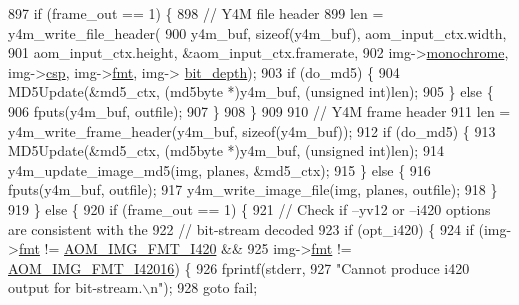 \begin{DoxyCodeInclude}
{{{{{{{{{{{{{{{{{{{{{{{{{{{{{{{{{{{{{{{{{{{{{{897             \textcolor{keywordflow}{if} (frame\_out == 1) \{
898               \textcolor{comment}{// Y4M file header}
899               len = y4m\_write\_file\_header(
900                   y4m\_buf, \textcolor{keyword}{sizeof}(y4m\_buf), aom\_input\_ctx.width,
901                   aom\_input\_ctx.height, &aom\_input\_ctx.framerate,
902                   img->\hyperlink{structaom__image_ab7886616025ff8bd0bb96d967fca9ad8}{monochrome}, img->\hyperlink{structaom__image_a4f235c521bc95a061e9e0b2a3d5d457e}{csp}, img->\hyperlink{structaom__image_a6c64b1ab918d80d52eb8f5d6d957e825}{fmt}, img->
      \hyperlink{structaom__image_a46ed9ffd741938d306a0db5a24bdcf8e}{bit\_depth});
903               \textcolor{keywordflow}{if} (do\_md5) \{
904                 MD5Update(&md5\_ctx, (md5byte *)y4m\_buf, (\textcolor{keywordtype}{unsigned} \textcolor{keywordtype}{int})len);
905               \} \textcolor{keywordflow}{else} \{
906                 fputs(y4m\_buf, outfile);
907               \}
908             \}
909 
910             \textcolor{comment}{// Y4M frame header}
911             len = y4m\_write\_frame\_header(y4m\_buf, \textcolor{keyword}{sizeof}(y4m\_buf));
912             \textcolor{keywordflow}{if} (do\_md5) \{
913               MD5Update(&md5\_ctx, (md5byte *)y4m\_buf, (\textcolor{keywordtype}{unsigned} \textcolor{keywordtype}{int})len);
914               y4m\_update\_image\_md5(img, planes, &md5\_ctx);
915             \} \textcolor{keywordflow}{else} \{
916               fputs(y4m\_buf, outfile);
917               y4m\_write\_image\_file(img, planes, outfile);
918             \}
919           \} \textcolor{keywordflow}{else} \{
920             \textcolor{keywordflow}{if} (frame\_out == 1) \{
921               \textcolor{comment}{// Check if --yv12 or --i420 options are consistent with the}
922               \textcolor{comment}{// bit-stream decoded}
923               \textcolor{keywordflow}{if} (opt\_i420) \{
924                 \textcolor{keywordflow}{if} (img->\hyperlink{structaom__image_a6c64b1ab918d80d52eb8f5d6d957e825}{fmt} != \hyperlink{aom__image_8h_a930317c04b4bd0a660bb5e744055523cabd778a3d697463e89d12a1117f417b60}{AOM\_IMG\_FMT\_I420} &&
925                     img->\hyperlink{structaom__image_a6c64b1ab918d80d52eb8f5d6d957e825}{fmt} != \hyperlink{aom__image_8h_a930317c04b4bd0a660bb5e744055523ca20a9cf30277260685642b4cfb4e9273b}{AOM\_IMG\_FMT\_I42016}) \{
926                   fprintf(stderr,
927                           \textcolor{stringliteral}{"Cannot produce i420 output for bit-stream.\(\backslash\)n"});
928                   \textcolor{keywordflow}{goto} fail;
}}}}}}}}}}}}}}}}}}}}}}}}}}}}}}}}}}}}}}}}}}}}}}
\end{DoxyCodeInclude}
